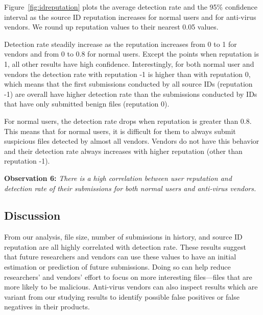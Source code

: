 Figure~\ref{fig:idreputation} plots the average detection rate and the 95\% confidence interval 
as the source ID reputation increases for normal users and for anti-virus vendors.
We round up reputation values to their nearest 0.05 values. 

Detection rate steadily increase as the reputation increases from 0 to 1 for vendors and from 0 to 0.8 for normal users.
Except the points when reputation is 1, all other results have high confidence.
Interestingly, for both normal user and vendors the detection rate with reputation -1 is higher than with reputation 0,
which means that the first submissions conducted by all source IDs (reputation -1) 
are overall have higher detection rate than 
the submissions conducted by IDs that have only submitted benign files (reputation 0).

For normal users, the detection rate drops when reputation is greater than 0.8.
This means that for normal users, it is difficult for them to always submit suspicious files detected by almost all vendors.
Vendors do not have this behavior and their detection rate always increases with higher reputation (other than reputation -1).


{\bf Observation 6:} 
{\em There is a high correlation between user reputation and detection rate of their submissions for both normal users and anti-virus vendors.}


\subsection{Discussion}

From our analysis, file size, number of submissions in history, and source ID reputation
are all highly correlated with detection rate. 
These results suggest that future researchers and vendors can use these values to have an initial estimation or prediction of future submissions.
Doing so can help reduce researchers' and vendors' effort to focus on more interesting files---files that are more likely to be malicious.
Anti-virus vendors can also inspect results which are variant from our studying results 
to identify possible false positives or false negatives in their products. 



